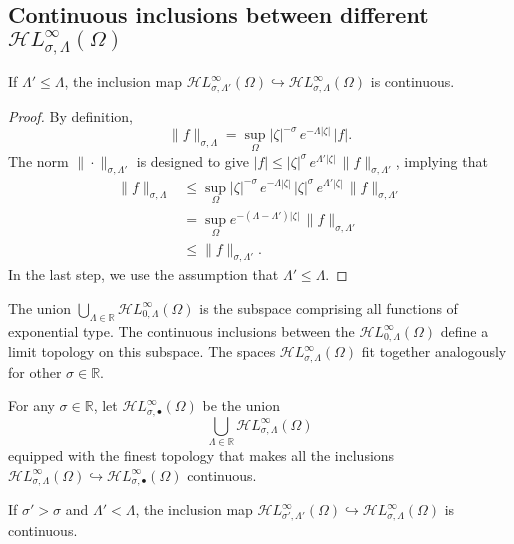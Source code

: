 \documentclass[review]{siamart220329}
\newcommand{\R}{\mathbb{R}}
\newcommand{\singexp}[2]{\mathcal{H}L^\infty_{#1, #2}}
\newcommand{\singexpalg}[1]{\singexp{#1}{\bullet}}
\newcommand{\domain}{\Omega}
\begin{document}
\subsection{Continuous inclusions between different $\singexp{\sigma}{\Lambda}(\Omega)$}\label{sec:inclusions}
\begin{proposition}\label{prop:inclus-ge-exp}
If $\Lambda'\leq\Lambda$, the inclusion map $\singexp{\sigma}{\Lambda'}(\Omega)\hookrightarrow \singexp{\sigma}{\Lambda}(\Omega)$ is continuous.
\end{proposition}
\begin{proof}
By definition,
\[ \|f\|_{\sigma,\Lambda}=\sup_{\Omega} |\zeta|^{-\sigma}\,e^{-\Lambda |\zeta|}\, |f|. \]
The norm $\|\cdot\|_{\sigma, \Lambda'}$ is designed to give $|f| \le |\zeta|^\sigma\,e^{\Lambda'|\zeta|}\,\|f\|_{\sigma, \Lambda'}$, implying that
\begin{align*}
\|f\|_{\sigma,\Lambda} & \leq \sup_{\Omega} |\zeta|^{-\sigma}\,e^{-\Lambda |\zeta|}\,|\zeta|^\sigma\,e^{\Lambda'|\zeta|}\,\|f\|_{\sigma, \Lambda'}\\
&=\sup_{\Omega} e^{-(\Lambda-\Lambda') |\zeta|}\,\|f\|_{\sigma, \Lambda'}\\
&\leq \|f\|_{\sigma,\Lambda'}.
\end{align*}
In the last step, we use the assumption that $\Lambda' \le \Lambda$.
\end{proof}
\color{blue}The union $\bigcup_{\Lambda \in \R} \singexp{0}{\Lambda}(\domain)$ is the subspace comprising all functions of exponential type. The continuous inclusions between the $\singexp{0}{\Lambda}(\domain)$ define a limit topology on this subspace. The spaces $\singexp{\sigma}{\Lambda}(\domain)$ fit together analogously for other $\sigma \in \R$.
\begin{definition}\label{def:exp-top}
For any $\sigma \in \R$, let $\singexpalg{\sigma}(\domain)$ be the union
\[ \bigcup_{\Lambda \in \R} \singexp{\sigma}{\Lambda}(\domain) \]
equipped with the finest topology that makes all the inclusions $\singexp{\sigma}{\Lambda}(\domain) \hookrightarrow \singexpalg{\sigma}(\domain)$ continuous.
\end{definition}\color{black}
\begin{proposition}\label{prop:inclus-lt-pow-gt-exp}
If $\sigma'>\sigma$ and $\Lambda'<\Lambda$, the inclusion map $\singexp{\sigma'}{\Lambda'}(\Omega)\hookrightarrow \singexp{\sigma}{\Lambda}(\Omega)$ is continuous.
\end{proposition}
\end{document}
